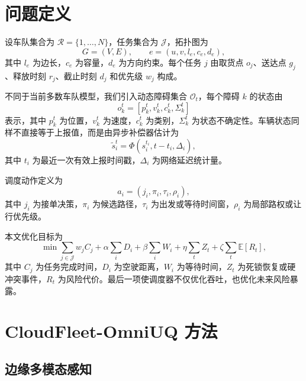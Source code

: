 \documentclass[UTF8,twocolumn,10pt]{ctexart}
\newcommand{\method}{CloudFleet-OmniUQ}
\begin{document}
\section{问题定义}

设车队集合为 $\mathcal{R}=\{1,\dots,N\}$，任务集合为 $\mathcal{J}$，拓扑图为
\begin{equation}
G=(V,E), \qquad e=(u,v,l_e,c_e,d_e),
\end{equation}
其中 $l_e$ 为边长，$c_e$ 为容量，$d_e$ 为方向约束。每个任务 $j$ 由取货点 $o_j$、送达点 $g_j$、释放时刻 $r_j$、截止时刻 $d_j$ 和优先级 $w_j$ 构成。

不同于当前多数车队模型，我们引入动态障碍集合 $\mathcal{O}_t$，每个障碍 $k$ 的状态由
\begin{equation}
o_k^t = [p_k^t, v_k^t, c_k^t, \Sigma_k^t]
\end{equation}
表示，其中 $p_k^t$ 为位置，$v_k^t$ 为速度，$c_k^t$ 为类别，$\Sigma_k^t$ 为状态不确定性。车辆状态同样不直接等于上报值，而是由异步补偿器估计为
\begin{equation}
\tilde{s}_i^t = \Phi(s_i^{t_i}, t-t_i, \Delta_i),
\end{equation}
其中 $t_i$ 为最近一次有效上报时间戳，$\Delta_i$ 为网络延迟统计量。

调度动作定义为
\begin{equation}
a_i = (j_i, \pi_i, \tau_i, \rho_i),
\end{equation}
其中 $j_i$ 为接单决策，$\pi_i$ 为候选路径，$\tau_i$ 为出发或等待时间窗，$\rho_i$ 为局部路权或让行优先级。

本文优化目标为
\begin{equation}
\min \sum_{j\in \mathcal{J}} w_j C_j
 + \alpha \sum_i D_i
 + \beta \sum_i W_i
 + \eta \sum_t Z_t
 + \zeta \sum_t \mathbb{E}[R_t],
\label{eq:objective}
\end{equation}
其中 $C_j$ 为任务完成时间，$D_i$ 为空驶距离，$W_i$ 为等待时间，$Z_t$ 为死锁恢复或硬冲突事件，$R_t$ 为风险代价。最后一项使调度器不仅优化吞吐，也优化未来风险暴露。

\section{\method{} 方法}

\subsection{边缘多模态感知}
\end{document}
